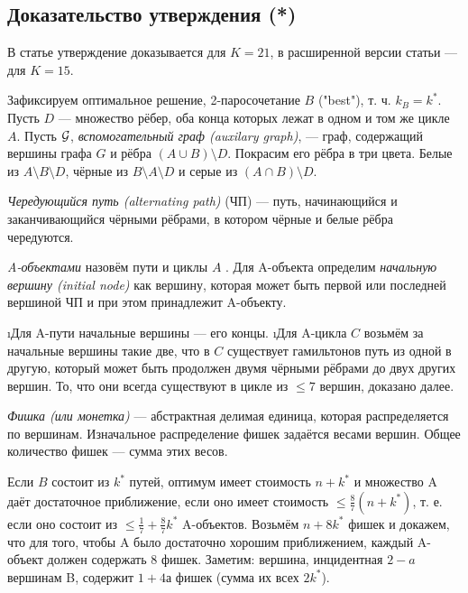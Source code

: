 \subsection{Доказательство утверждения (*)}
В статье \cite{BK06} утверждение доказывается для $K=21$, в расширенной версии статьи --- для $K=15$.
\begin{proofstar}
Зафиксируем оптимальное решение, 2-паросочетание $B$ ("best"), т. ч. $k_B = k^*$. Пусть $D$ --- множество рёбер, оба конца которых лежат в одном и том же цикле $A$. Пусть $\mathcal{G}$, \textit{вспомогательный граф (auxilary graph)}, --- граф, содержащий вершины графа $G$ и рёбра $(A \cup B) \setminus D$. Покрасим его рёбра в три цвета.
Белые из $A \setminus B \setminus D$, чёрные из $B \setminus A \setminus D$ и серые из $(A \cap B) \setminus D$. 

\begin{defn} 
\textit{Чередующийся путь (alternating path)} (ЧП) ---  путь, начинающийся и заканчивающийся чёрными рёбрами, в котором чёрные и белые рёбра чередуются.
\end{defn}

\begin{defn}
\textit{A-объектами} назовём пути и циклы $A$ . Для A-объекта определим \textit{начальную вершину (initial node)} как вершину, которая может быть первой или последней вершиной ЧП и при этом принадлежит A-объекту. 
\begin{itemize}
\i Для A-пути начальные вершины --- его концы. 
\i Для A-цикла $C$ возьмём за начальные вершины такие две, что в $C$ существует гамильтонов путь из одной в другую, который может быть продолжен двумя чёрными рёбрами до двух других вершин. То, что они всегда существуют в цикле из $\le 7$ вершин, доказано далее.
\end{itemize}
\end{defn}

\begin{defn} 
\textit{Фишка (или монетка)} --- абстрактная делимая единица, которая распределяется по вершинам. Изначальное распределение фишек задаётся весами вершин. Общее количество фишек --- сумма этих весов.
\end{defn}

Если $B$ состоит из $k^*$ путей, оптимум имеет стоимость $n+k^*$ и множество A даёт достаточное приближение, если оно имеет стоимость $\le \frac{8}{7}(n+k^*)$, т. е. если оно состоит из $\le \frac{1}{7} + \frac{8}{7}k^*$ A-объектов. Возьмём $n+8k^*$ фишек и докажем, что для того, чтобы A было достаточно хорошим приближением, каждый A-объект должен содержать 8 фишек.
Заметим: вершина, инцидентная $2-a$ вершинам B, содержит $1+4а$ фишек (сумма их всех $2k^*$). 


\end{proofstar}
